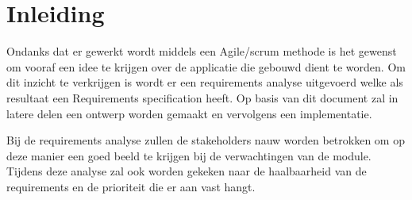 
\chapter{Inleiding}\label{ch:ReqInl}
Ondanks dat er gewerkt wordt middels een Agile/scrum methode is het gewenst om vooraf een idee te krijgen over de applicatie die gebouwd dient te worden. Om dit inzicht te verkrijgen is wordt er een requirements analyse uitgevoerd welke als resultaat een Requirements specification heeft. Op basis van dit document zal in latere delen een ontwerp worden gemaakt en vervolgens een implementatie.

Bij de requirements analyse zullen de stakeholders nauw worden betrokken om op deze manier
een goed beeld te krijgen bij de verwachtingen van de module. Tijdens deze analyse zal ook worden gekeken naar de haalbaarheid van de requirements en de prioriteit die er aan vast hangt.
